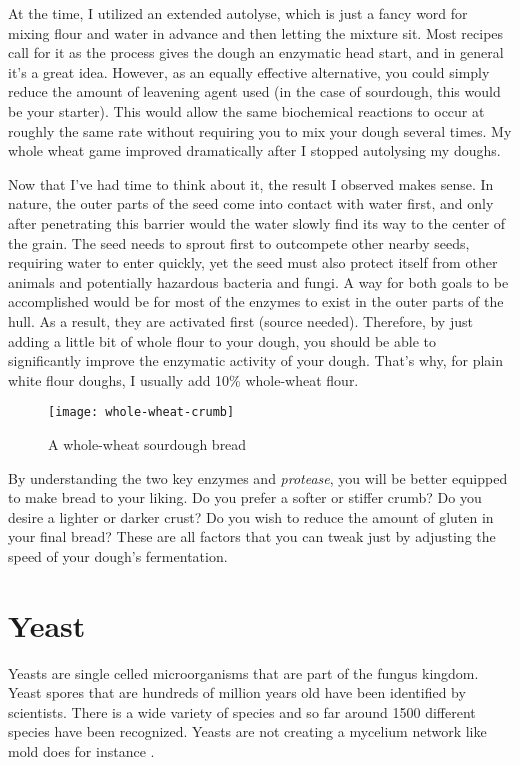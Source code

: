 At the time, I utilized an extended autolyse, which is just a fancy word for
mixing flour and water in advance and then letting the mixture sit. Most
recipes call for it as the process gives the dough an enzymatic head start, and
in general it's a great idea. However, as an equally effective alternative,
you could simply reduce the amount of leavening agent used (in the case of
sourdough, this would be your starter). This would allow the same biochemical
reactions to occur at roughly the same rate without requiring you to mix your
dough several times. My whole wheat game improved dramatically after I stopped
autolysing my doughs.

Now that I've had time to think about it, the result I observed makes sense.
In nature, the outer parts of the seed come into contact with water first, and
only after penetrating this barrier would the water slowly find its way to the
center of the grain. The seed needs to sprout first to outcompete other nearby
seeds, requiring water to enter quickly, yet the seed must also protect itself
from other animals and potentially hazardous bacteria and fungi. A way for both
goals to be accomplished would be for most of the enzymes to exist in the outer
parts of the hull. As a result, they are activated first (source needed).
Therefore, by just adding a little bit of whole flour to your dough, you should
be able to significantly improve the enzymatic activity of your dough. That's
why, for plain white flour doughs, I usually add 10\% whole-wheat
flour.

\begin{figure}
  \texttt{[image: whole-wheat-crumb]}
  \caption{A whole-wheat sourdough bread}
  \label{whole-wheat-crumb}
\end{figure}


By understanding the two key enzymes  and \textit{protease}, you
will be better equipped to make bread to your liking. Do you prefer a softer
or stiffer crumb? Do you desire a lighter or darker crust? Do you wish to reduce
the amount of gluten in your final bread? These are all factors that you can
tweak just by adjusting the speed of your dough's fermentation.

\section{Yeast}

Yeasts are single celled microorganisms that are part of
the fungus kingdom. Yeast spores that are hundreds
of million years old have been identified by scientists.
There is a wide variety of species and so far around 1500
different species have been recognized. Yeasts are not creating
a mycelium network like mold does for instance
\cite{molecular+mechanisms+yeast}.

